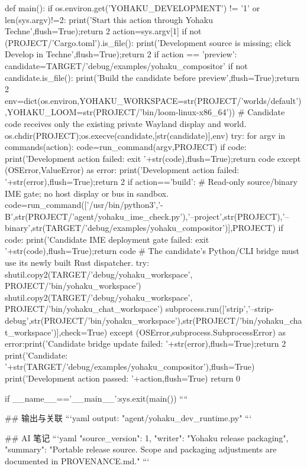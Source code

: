 def main():
    if os.environ.get('YOHAKU_DEVELOPMENT') != '1' or len(sys.argv)!=2:
        print('Start this action through Yohaku Techne',flush=True);return 2
    action=sys.argv[1]
    if not (PROJECT/'Cargo.toml').is_file():
        print('Development source is missing; click Develop in Techne',flush=True);return 2
    if action == 'preview':
        candidate=TARGET/'debug/examples/yohaku_compositor'
        if not candidate.is_file(): print('Build the candidate before preview',flush=True);return 2
        env=dict(os.environ,YOHAKU_WORKSPACE=str(PROJECT/'worlds/default'),YOHAKU_LOOM=str(PROJECT/'bin/loom-linux-x86_64'))
        # Candidate code receives only the existing private Wayland display and world.
        os.chdir(PROJECT);os.execve(candidate,[str(candidate)],env)
    try:
        for argv in commands(action):
            code=run_command(argv,PROJECT)
            if code: print('Development action failed: exit '+str(code),flush=True);return code
    except (OSError,ValueError) as error:
        print('Development action failed: '+str(error),flush=True);return 2
    if action=='build':
        # Read-only source/binary IME gate; no host display or bus in sandbox.
        code=run_command(['/usr/bin/python3','-B',str(PROJECT/'agent/yohaku_ime_check.py'),'--project',str(PROJECT),'--binary',str(TARGET/'debug/examples/yohaku_compositor')],PROJECT)
        if code:
            print('Candidate IME deployment gate failed: exit '+str(code),flush=True);return code
        # The candidate's Python/CLI bridge must use its newly built Rust dispatcher.
        try:
            shutil.copy2(TARGET/'debug/yohaku_workspace', PROJECT/'bin/yohaku_workspace')
            shutil.copy2(TARGET/'debug/yohaku_workspace', PROJECT/'bin/yohaku_chat_workspace')
            subprocess.run(['strip','--strip-debug',str(PROJECT/'bin/yohaku_workspace'),str(PROJECT/'bin/yohaku_chat_workspace')],check=True)
        except (OSError,subprocess.SubprocessError) as error:print('Candidate bridge update failed: '+str(error),flush=True);return 2
        print('Candidate: '+str(TARGET/'debug/examples/yohaku_compositor'),flush=True)
    print('Development action passed: '+action,flush=True)
    return 0

if __name__=='__main__':sys.exit(main())
````

## 输出与关联
```yaml
output: "agent/yohaku_dev_runtime.py"
```

## AI 笔记
```yaml
{"source_version": 1, "writer": "Yohaku release packaging", "summary": "Portable release source. Scope and packaging adjustments are documented in PROVENANCE.md."}
```
